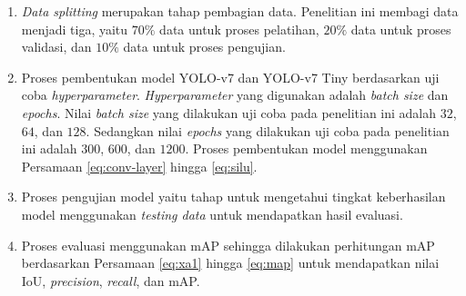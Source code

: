 \begin{enumerate}
    \item \textit{Data splitting} merupakan tahap pembagian data. Penelitian ini membagi data menjadi tiga, yaitu $70\%$ data untuk proses pelatihan, $20\%$ data untuk proses validasi, dan $10\%$ data untuk proses pengujian.
    \item Proses pembentukan model YOLO-v7 dan YOLO-v7 Tiny berdasarkan uji coba \textit{hyperparameter}. \textit{Hyperparameter} yang digunakan adalah \textit{batch size} dan \textit{epochs}. Nilai \textit{batch size} yang dilakukan uji coba pada penelitian ini adalah $32$, $64$, dan $128$. Sedangkan nilai \textit{epochs} yang dilakukan uji coba pada penelitian ini adalah $300$, $600$, dan $1200$. Proses pembentukan model menggunakan Persamaan \ref{eq:conv-layer} hingga \ref{eq:silu}.
    \item Proses pengujian model yaitu tahap untuk mengetahui tingkat keberhasilan model menggunakan \textit{testing data} untuk mendapatkan hasil evaluasi.
    \item Proses evaluasi menggunakan mAP sehingga dilakukan perhitungan mAP berdasarkan Persamaan \ref{eq:xa1} hingga \ref{eq:map} untuk mendapatkan nilai IoU, \textit{precision}, \textit{recall}, dan mAP.
\end{enumerate}
